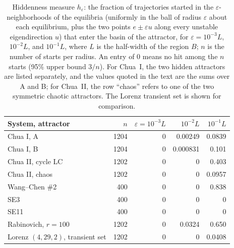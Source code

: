 \begin{table}[tbhp]
\centering
\caption{Hiddenness measure $h_\varepsilon$: the fraction of trajectories started in the $\varepsilon$-neighborhoods of the equilibria (uniformly in the ball of radius $\varepsilon$ about each equilibrium, plus the two points $e\pm\varepsilon u$ along every unstable eigendirection $u$) that enter the basin of the attractor, for $\varepsilon=10^{-3}L$, $10^{-2}L$, and $10^{-1}L$, where $L$ is the half-width of the region $B$; $n$ is the number of starts per radius. An entry of 0 means no hit among the $n$ starts (95\% upper bound $3/n$). For Chua~I, the two hidden attractors are listed separately, and the values quoted in the text are the sums over A and B; for Chua~II, the row ``chaos'' refers to one of the two symmetric chaotic attractors. The Lorenz transient set is shown for comparison.}
\label{tab:hidden}
\footnotesize

\begin{tabular}{lrrrr}
\toprule
System, attractor & $n$ & $\varepsilon=10^{-3}L$ & $10^{-2}L$ & $10^{-1}L$ \\
\midrule
Chua I, A & 1204 & 0 & 0.00249 & 0.0839 \\
Chua I, B & 1204 & 0 & 0.000831 & 0.101 \\
Chua II, cycle LC & 1202 & 0 & 0 & 0.403 \\
Chua II, chaos & 1202 & 0 & 0 & 0.0957 \\
Wang--Chen \#2 & 400 & 0 & 0 & 0.838 \\
SE3 & 400 & 0 & 0 & 0 \\
SE11 & 400 & 0 & 0 & 0 \\
Rabinovich, $r=100$ & 1202 & 0 & 0.0324 & 0.650 \\
Lorenz $(4,29,2)$, transient set & 1202 & 0 & 0 & 0.0408 \\
\bottomrule
\end{tabular}

\end{table}
